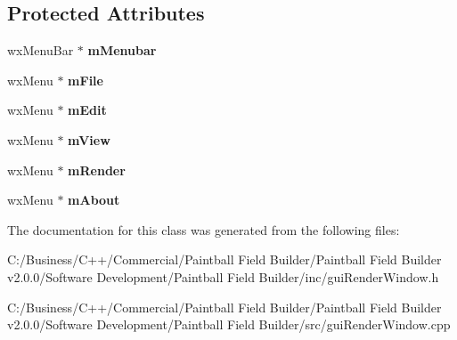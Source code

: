 \subsection*{Protected Attributes}
\begin{DoxyCompactItemize}
\item 
\hypertarget{classgui_render_window_af15c9874acb3f51bc30e4bcf800b027e}{
wxMenuBar $\ast$ {\bfseries mMenubar}}
\label{classgui_render_window_af15c9874acb3f51bc30e4bcf800b027e}

\item 
\hypertarget{classgui_render_window_a69b598d42bd5ad5150e8c682c4a46484}{
wxMenu $\ast$ {\bfseries mFile}}
\label{classgui_render_window_a69b598d42bd5ad5150e8c682c4a46484}

\item 
\hypertarget{classgui_render_window_a6ad18cff31082f4aabdf66d9eaa1659a}{
wxMenu $\ast$ {\bfseries mEdit}}
\label{classgui_render_window_a6ad18cff31082f4aabdf66d9eaa1659a}

\item 
\hypertarget{classgui_render_window_a125fe97572d8f9639eaf20c2ff724144}{
wxMenu $\ast$ {\bfseries mView}}
\label{classgui_render_window_a125fe97572d8f9639eaf20c2ff724144}

\item 
\hypertarget{classgui_render_window_a725efa48d4a8cace3d2a45418e70ad1a}{
wxMenu $\ast$ {\bfseries mRender}}
\label{classgui_render_window_a725efa48d4a8cace3d2a45418e70ad1a}

\item 
\hypertarget{classgui_render_window_a9385fa1f03cfca0238acac9522c53108}{
wxMenu $\ast$ {\bfseries mAbout}}
\label{classgui_render_window_a9385fa1f03cfca0238acac9522c53108}

\end{DoxyCompactItemize}


The documentation for this class was generated from the following files:\begin{DoxyCompactItemize}
\item 
C:/Business/C++/Commercial/Paintball Field Builder/Paintball Field Builder v2.0.0/Software Development/Paintball Field Builder/inc/guiRenderWindow.h\item 
C:/Business/C++/Commercial/Paintball Field Builder/Paintball Field Builder v2.0.0/Software Development/Paintball Field Builder/src/guiRenderWindow.cpp\end{DoxyCompactItemize}
